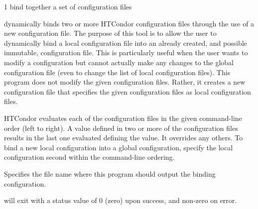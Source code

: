 \begin{ManPage}{\label{man-condor-config-bind}}{1}
{bind together a set of configuration files}

\Synopsis {}



\Description

 dynamically binds two or more HTCondor
configuration files through the use of a new configuration file.  The
purpose of this tool is to allow the user to dynamically bind a local
configuration file into an already created, and possible immutable,
configuration file.  This is particularly useful when the user wants to
modify a configuration but cannot actually make any changes to the
global configuration file (even to change the list of local configuration
files).  This program does not modify the given configuration files.
Rather, it creates a new configuration file that specifies the given
configuration files as local configuration files.  

HTCondor evaluates each of the configuration files in the given
command-line order (left to right).
A value defined 
in two or more of the configuration files results in
the last one evaluated defining the value. It overrides any others.
To bind a new local configuration into a global configuration, 
specify the local configuration second within the command-line
ordering.

\begin{Options}
   {
    Specifies the file name where this program should output the
    binding configuration. 
  }
\end{Options}

\ExitStatus

 will exit with a status value of 0 (zero) upon
success, and non-zero on error.

\end{ManPage}
